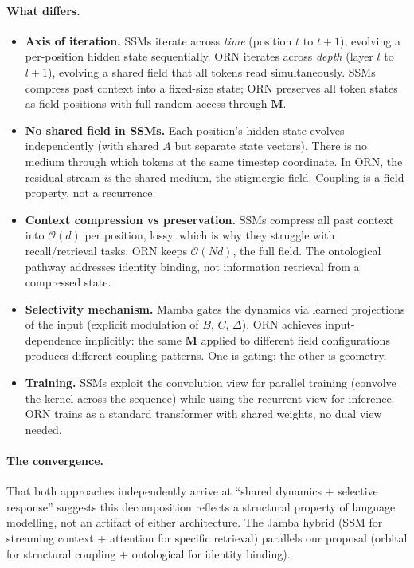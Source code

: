 \documentclass[11pt, a4paper]{article}
\newcommand{\M}{\mathbf{M}}
\theoremstyle{remark}
\begin{document}
\paragraph{What differs.}
\begin{itemize}[nosep]
    \item \textbf{Axis of iteration.} SSMs iterate across \emph{time} (position $t$ to $t{+}1$), evolving a per-position hidden state sequentially. ORN iterates across \emph{depth} (layer $l$ to $l{+}1$), evolving a shared field that all tokens read simultaneously. SSMs compress past context into a fixed-size state; ORN preserves all token states as field positions with full random access through $\M$.
    \item \textbf{No shared field in SSMs.} Each position's hidden state evolves independently (with shared $A$ but separate state vectors). There is no medium through which tokens at the same timestep coordinate. In ORN, the residual stream \emph{is} the shared medium, the stigmergic field. Coupling is a field property, not a recurrence.
    \item \textbf{Context compression vs preservation.} SSMs compress all past context into $\mathcal{O}(d)$ per position, lossy, which is why they struggle with recall/retrieval tasks. ORN keeps $\mathcal{O}(Nd)$, the full field. The ontological pathway addresses identity binding, not information retrieval from a compressed state.
    \item \textbf{Selectivity mechanism.} Mamba gates the dynamics via learned projections of the input (explicit modulation of $B$, $C$, $\Delta$). ORN achieves input-dependence implicitly: the same $\M$ applied to different field configurations produces different coupling patterns. One is gating; the other is geometry.
    \item \textbf{Training.} SSMs exploit the convolution view for parallel training (convolve the kernel across the sequence) while using the recurrent view for inference. ORN trains as a standard transformer with shared weights, no dual view needed.
\end{itemize}

\paragraph{The convergence.}
That both approaches independently arrive at ``shared dynamics + selective response'' suggests this decomposition reflects a structural property of language modelling, not an artifact of either architecture.
The Jamba hybrid (SSM for streaming context + attention for specific retrieval) parallels our proposal (orbital for structural coupling + ontological for identity binding).
\end{document}
